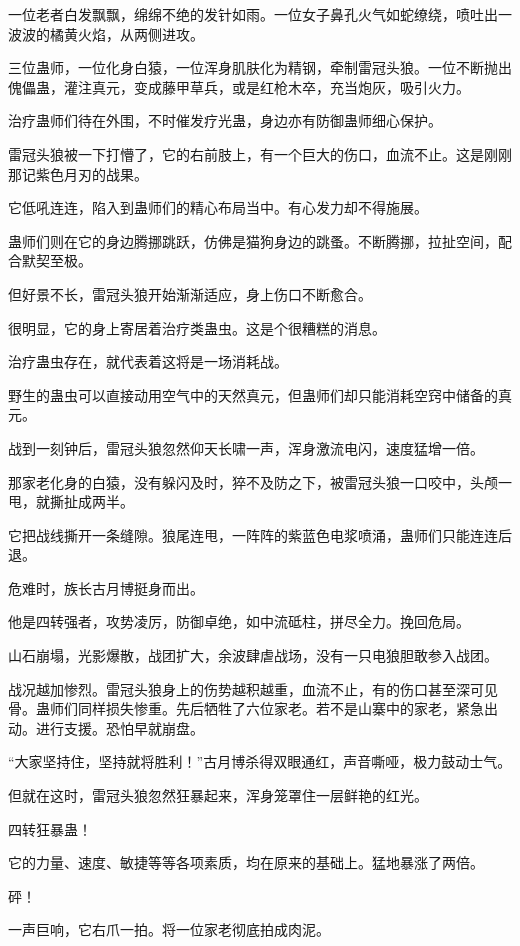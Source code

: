 \begin{this_body}
一位老者白发飘飘，绵绵不绝的发针如雨。一位女子鼻孔火气如蛇缭绕，喷吐出一波波的橘黄火焰，从两侧进攻。

三位蛊师，一位化身白猿，一位浑身肌肤化为精钢，牵制雷冠头狼。一位不断抛出傀儡蛊，灌注真元，变成藤甲草兵，或是红枪木卒，充当炮灰，吸引火力。

治疗蛊师们待在外围，不时催发疗光蛊，身边亦有防御蛊师细心保护。

雷冠头狼被一下打懵了，它的右前肢上，有一个巨大的伤口，血流不止。这是刚刚那记紫色月刃的战果。

它低吼连连，陷入到蛊师们的精心布局当中。有心发力却不得施展。

蛊师们则在它的身边腾挪跳跃，仿佛是猫狗身边的跳蚤。不断腾挪，拉扯空间，配合默契至极。

但好景不长，雷冠头狼开始渐渐适应，身上伤口不断愈合。

很明显，它的身上寄居着治疗类蛊虫。这是个很糟糕的消息。

治疗蛊虫存在，就代表着这将是一场消耗战。

野生的蛊虫可以直接动用空气中的天然真元，但蛊师们却只能消耗空窍中储备的真元。

战到一刻钟后，雷冠头狼忽然仰天长啸一声，浑身激流电闪，速度猛增一倍。

那家老化身的白猿，没有躲闪及时，猝不及防之下，被雷冠头狼一口咬中，头颅一甩，就撕扯成两半。

它把战线撕开一条缝隙。狼尾连甩，一阵阵的紫蓝色电浆喷涌，蛊师们只能连连后退。

危难时，族长古月博挺身而出。

他是四转强者，攻势凌厉，防御卓绝，如中流砥柱，拼尽全力。挽回危局。

山石崩塌，光影爆散，战团扩大，余波肆虐战场，没有一只电狼胆敢参入战团。

战况越加惨烈。雷冠头狼身上的伤势越积越重，血流不止，有的伤口甚至深可见骨。蛊师们同样损失惨重。先后牺牲了六位家老。若不是山寨中的家老，紧急出动。进行支援。恐怕早就崩盘。

“大家坚持住，坚持就将胜利！”古月博杀得双眼通红，声音嘶哑，极力鼓动士气。

但就在这时，雷冠头狼忽然狂暴起来，浑身笼罩住一层鲜艳的红光。

四转狂暴蛊！

它的力量、速度、敏捷等等各项素质，均在原来的基础上。猛地暴涨了两倍。

砰！

一声巨响，它右爪一拍。将一位家老彻底拍成肉泥。


\end{this_body}
